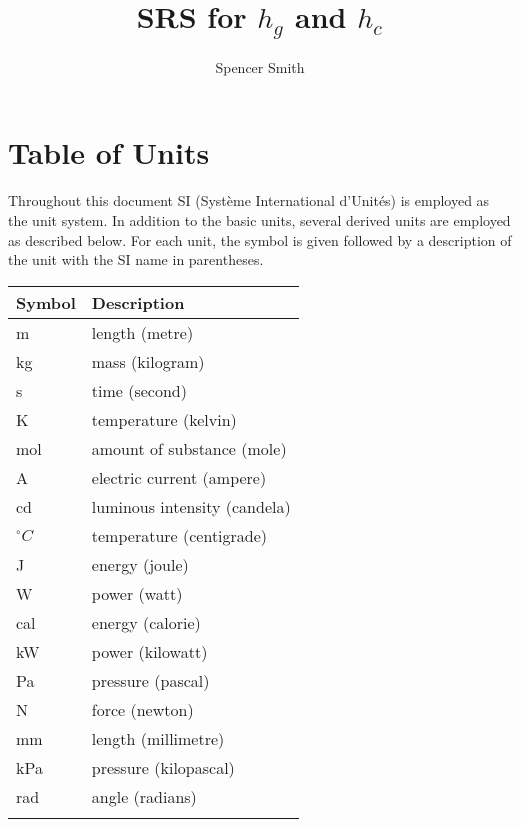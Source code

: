 \documentclass[12pt]{article}
\title{SRS for $h_{g}$ and $h_{c}$}
\author{Spencer Smith}
\begin{document}
\maketitle
\tableofcontents
\newpage
\section{Table of Units}
\label{Sec:ToU}
Throughout this document SI (Syst\`{e}me International d'Unit\'{e}s) is employed as the unit system. In addition to the basic units, several derived units are employed as described below. For each unit, the symbol is given followed by a description of the unit with the SI name in parentheses.
\begin{longtable*}{l l}
\toprule
Symbol & Description
\\
\midrule
m & length (metre)
\\
kg & mass (kilogram)
\\
s & time (second)
\\
K & temperature (kelvin)
\\
mol & amount of substance (mole)
\\
A & electric current (ampere)
\\
cd & luminous intensity (candela)
\\
${}^{\circ}C$ & temperature (centigrade)
\\
J & energy (joule)
\\
W & power (watt)
\\
cal & energy (calorie)
\\
kW & power (kilowatt)
\\
Pa & pressure (pascal)
\\
N & force (newton)
\\
mm & length (millimetre)
\\
kPa & pressure (kilopascal)
\\
rad & angle (radians)
\\
\bottomrule
\label{Table:ToU}
\end{longtable*}
\end{document}
